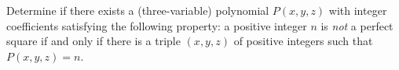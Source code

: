 Determine if there exists a (three-variable) polynomial $P(x,y,z)$ with integer coefficients satisfying the following property: a positive integer $n$ is \emph{not} a perfect square if and only if there is a triple $(x,y,z)$ of positive integers such that $P(x,y,z) = n$.
